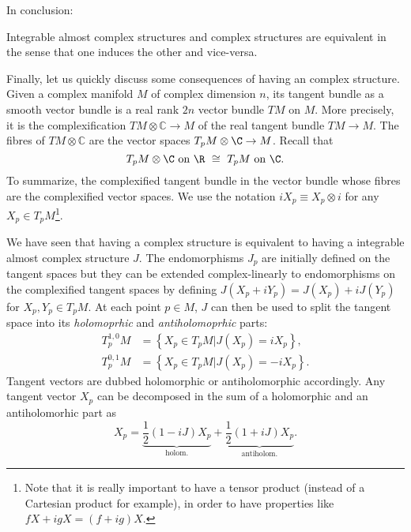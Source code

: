 \documentclass{worksheetclass}
\begin{document}
        In conclusion:
        \begin{result}
            Integrable almost complex structures and complex structures are equivalent in the sense that one induces the other and vice-versa.
        \end{result}

        Finally, let us quickly discuss some consequences of having an complex structure. Given a complex manifold $M$ of complex dimension $n$, its tangent bundle as a smooth vector bundle is a real rank $2n$ vector bundle $TM$ on $M$. More precisely, it is the complexification $\displaystyle TM\otimes \mathbb{C} \to M$ of the real tangent bundle $\displaystyle TM \to M$. The fibres of $TM\otimes \mathbb{C}$ are the vector spaces $T_pM\otimes\C\to M$. Recall that
        \begin{equation*}
            T_pM\otimes \C\text{ on }\R ~\cong~ T_pM\text{ on }\C.
        \end{equation*}
        To summarize, the complexified tangent bundle in the vector bundle whose fibres are the complexified vector spaces. We use the notation $iX_p\equiv X_p\otimes i$ for any $X_p\in T_pM$\footnote{Note that it is really important to have a tensor product (instead of a Cartesian product for example), in order to have properties like $fX+igX = (f+ig)X$.}. 
        
        We have seen that having a complex structure is equivalent to having a integrable almost complex structure $J$. The endomorphisms $J_p$ are initially defined on the tangent spaces but they can be extended complex-linearly to endomorphisms on the complexified tangent spaces by defining $J(X_p+iY_p)=J(X_p)+iJ(Y_p)$ for $X_p,Y_p\in T_pM$. At each point $p\in M$, $J$ can then be used to split the tangent space into its \emph{holomoprhic} and \emph{antiholomoprhic} parts:
        \begin{align}
                T^{1,0}_pM &= \left\{X_p\in T_pM|J(X_p)=iX_p\right\},\label{eq:tangentspacesplit1}\\
                T^{0,1}_pM &= \left\{X_p\in T_pM|J(X_p)=-iX_p\right\}.\label{eq:tangentspacesplit2}
        \end{align}
        Tangent vectors are dubbed holomorphic or antiholomorphic accordingly. Any tangent vector $X_p$ can be decomposed in the sum of a holomorphic and an antiholomorhic part as
        \begin{equation}
            X_p = \underbrace{\frac{1}{2}(1-iJ)X_p}_{\text{holom.}}+\underbrace{\frac{1}{2}(1+iJ)X_p}_{\text{antiholom.}}.
        \end{equation}
\end{document}
